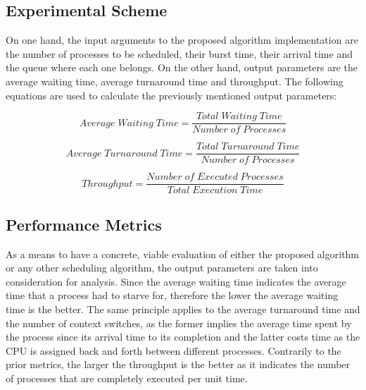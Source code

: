 \documentclass[conference]{IEEEtran}
\begin{document}

\subsection{Experimental Scheme}

On one hand, the input arguments to the proposed algorithm implementation are the number of processes to be scheduled, their burst time, their arrival time and the queue where each one belongs. On the other hand, output parameters are the average waiting time, average turnaround time and throughput. The following equations are used to calculate the previously mentioned output parameters:

\begin{equation}
    Average\; Waiting\; Time =  \frac{Total \; Waiting \; Time}{Number \; of \; Processes} \label{eq2}
\end{equation}

\begin{equation}
    Average\; Turnaround\; Time =  \frac{Total \; Turnaround \; Time}{Number \; of \; Processes} \label{eq3}
\end{equation}

\begin{equation}
    Throughput =  \frac{Number \; of \; Executed \; Processes}{Total \; Execution \; Time} \label{eq4}
\end{equation}



\subsection{Performance Metrics}

As a means to have a concrete, viable evaluation of either the proposed algorithm or any other scheduling algorithm, the output parameters are taken into consideration for analysis. Since the average waiting time indicates the average time that a  process had to starve for, therefore the lower the average waiting time is the better. The same principle applies to the average turnaround time and the number of context switches, as the former implies the average time spent by the process since its arrival time to its completion and the latter costs time as the CPU is assigned back and forth between different processes. Contrarily to the prior metrics, the larger the throughput is the better as it indicates the number of processes that are completely executed per unit time.
\end{document}
